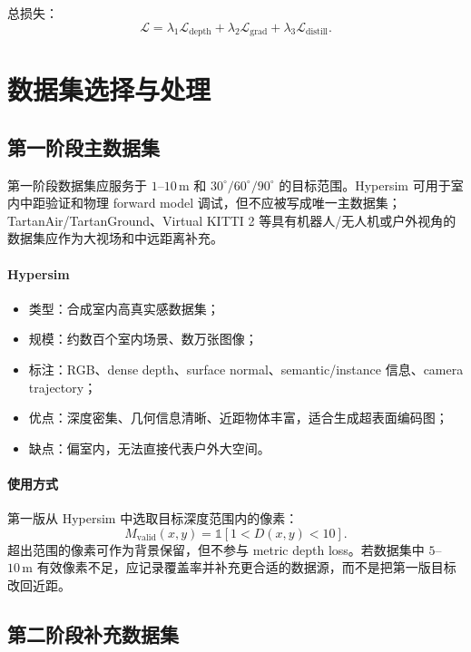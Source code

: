 \documentclass[11pt,a4paper,fontset=none]{ctexart}
\begin{document}
总损失：
\begin{equation}
  \mathcal L
  =
  \lambda_1\mathcal L_{\mathrm{depth}}
  +
  \lambda_2\mathcal L_{\mathrm{grad}}
  +
  \lambda_3\mathcal L_{\mathrm{distill}}.
\end{equation}

\section{数据集选择与处理}

\subsection{第一阶段主数据集}

第一阶段数据集应服务于 $1$--$10\,\mathrm{m}$ 和 $30^\circ/60^\circ/90^\circ$ 的目标范围。Hypersim 可用于室内中距验证和物理 forward model 调试，但不应被写成唯一主数据集；TartanAir/TartanGround、Virtual KITTI 2 等具有机器人/无人机或户外视角的数据集应作为大视场和中远距离补充。

\paragraph{Hypersim}
\begin{itemize}
  \item 类型：合成室内高真实感数据集；
  \item 规模：约数百个室内场景、数万张图像；
  \item 标注：RGB、dense depth、surface normal、semantic/instance 信息、camera trajectory；
  \item 优点：深度密集、几何信息清晰、近距物体丰富，适合生成超表面编码图；
  \item 缺点：偏室内，无法直接代表户外大空间。
\end{itemize}

\paragraph{使用方式}
第一版从 Hypersim 中选取目标深度范围内的像素：
\begin{equation}
  M_{\mathrm{valid}}(x,y)
  =
  \mathbb 1[1<D(x,y)<10].
\end{equation}
超出范围的像素可作为背景保留，但不参与 metric depth loss。若数据集中 $5$--$10\,\mathrm{m}$ 有效像素不足，应记录覆盖率并补充更合适的数据源，而不是把第一版目标改回近距。

\subsection{第二阶段补充数据集}
\end{document}
